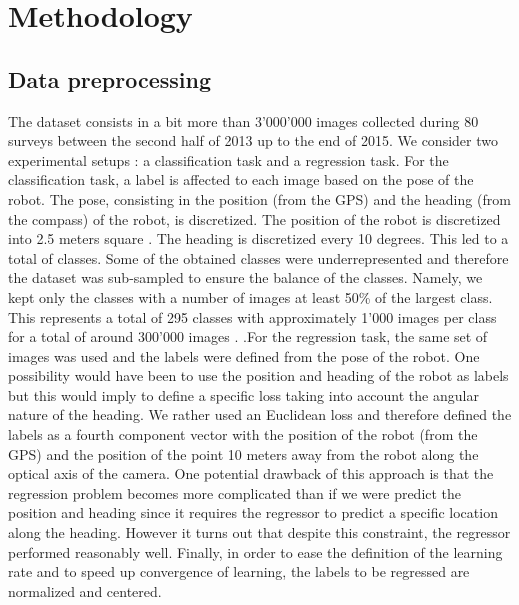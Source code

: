 \section{Methodology}

%

%

\subsection{Data preprocessing}


The dataset consists in a bit more than 3'000'000 images collected during 80 surveys between the second half of 2013 up to the end of 2015. We consider two experimental setups : a classification task and a regression task. For the classification task, a label is affected to each image based on the pose of the robot. The pose, consisting in the position (from the GPS) and the heading (from the compass) of the robot, is discretized. The position of the robot is discretized into 2.5 meters square . The heading is discretized every 10 degrees. This led to a total of  classes. Some of the obtained classes were underrepresented and therefore the dataset was sub-sampled to ensure the balance of the classes. Namely, we kept only the classes with a number of images at least 50\% of the largest class. This represents a total of 295 classes with approximately 1'000 images per class for a total of around 300'000 images . .For the regression task, the same set of images was used and the labels were defined from the pose of the robot. One possibility would have been to use the position and heading of the robot as labels but this would imply to define a specific loss taking into account the angular nature of the heading. We rather used an Euclidean loss and therefore defined the labels as a fourth component vector with the position of the robot (from the GPS) and the position of the point 10 meters away from the robot along the optical axis of the camera. One potential drawback of this approach is that the regression problem becomes more complicated than if we were predict the position and heading since it requires the regressor to predict a specific location along the heading. However it turns out that despite this constraint, the regressor performed reasonably well. Finally, in order to ease the definition of the learning rate and to speed up convergence of learning, the labels to be regressed are normalized and centered.


